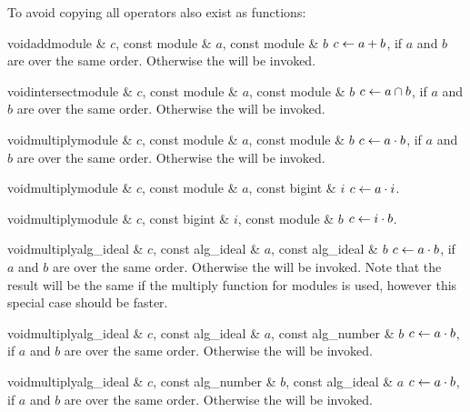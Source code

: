 To avoid copying all operators also exist as functions:

\begin{fcode}{void}{add}{module & $c$, const module & $a$, const module & $b$}
  $c \leftarrow a + b$, if $a$ and $b$ are over the same order.  Otherwise the \LEH will be
  invoked.
\end{fcode}

\begin{fcode}{void}{intersect}{module & $c$, const module & $a$, const module & $b$}
  $c \leftarrow a \cap b$, if $a$ and $b$ are over the same order.  Otherwise the \LEH will be
  invoked.
\end{fcode}

\begin{fcode}{void}{multiply}{module & $c$, const module & $a$, const module & $b$}
  $c \leftarrow a \cdot b$, if $a$ and $b$ are over the same order.  Otherwise the \LEH will be
  invoked.
\end{fcode}

\begin{fcode}{void}{multiply}{module & $c$, const module & $a$, const bigint & $i$}
  $c \leftarrow a \cdot i$.
\end{fcode}

\begin{fcode}{void}{multiply}{module & $c$, const bigint & $i$, const module & $b$}
  $c \leftarrow i \cdot b$.
\end{fcode}

\begin{fcode}{void}{multiply}{alg_ideal & $c$, const alg_ideal & $a$, const alg_ideal & $b$}
  $c \leftarrow a \cdot b$, if $a$ and $b$ are over the same order.  Otherwise the \LEH will be
  invoked.  Note that the result will be the same if the multiply function for modules is used,
  however this special case should be faster.
\end{fcode}

\begin{fcode}{void}{multiply}{alg_ideal & $c$, const alg_ideal & $a$, const alg_number & $b$}
  $c \leftarrow a \cdot b$, if $a$ and $b$ are over the same order.  Otherwise the \LEH will be
  invoked.
\end{fcode}

\begin{fcode}{void}{multiply}{alg_ideal & $c$, const alg_number & $b$, const alg_ideal & $a$}
  $c \leftarrow a \cdot b$, if $a$ and $b$ are over the same order.  Otherwise the \LEH will be
  invoked.
\end{fcode}

